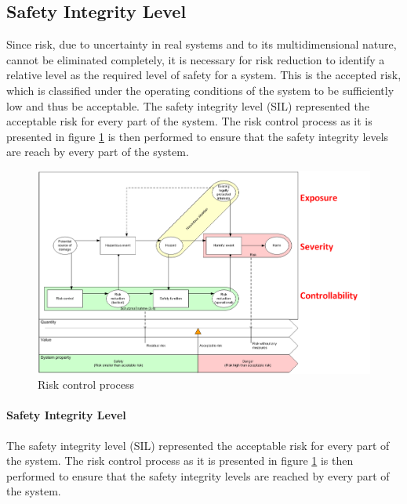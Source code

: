 \documentclass{template/openetcs_report}
\begin{document}
\subsection{Safety Integrity Level}

Since risk, due to  uncertainty in real systems and to its multidimensional nature, cannot be eliminated completely, it is necessary for risk reduction to identify a relative level  as the required level of safety for a system. This is the accepted risk, which is classified under the operating conditions of the system to be sufficiently low and thus be acceptable. The safety integrity level (SIL) represented the acceptable risk for every part of the system. The risk control process as it is presented in figure \ref{fig:Risk-control-modell-eng} is then performed to ensure that the safety integrity levels are reach by every part of the system.

\begin{figure}[htbp]
\centering
\includegraphics[width=0.9\linewidth]{bld_2013-06-19_Risk-control-modell_1-0_jw}
\caption{Risk control process \cite{Schnieder.2013}}
\label{fig:Risk-control-modell-eng}
\end{figure}

\paragraph{Safety Integrity Level}

The safety integrity level (SIL) represented the acceptable risk for every part of the system. The risk control process as it is presented in figure \ref{fig:Risk-control-modell-eng} is then performed to ensure that the safety integrity levels are reached by every part of the system.
\end{document}
